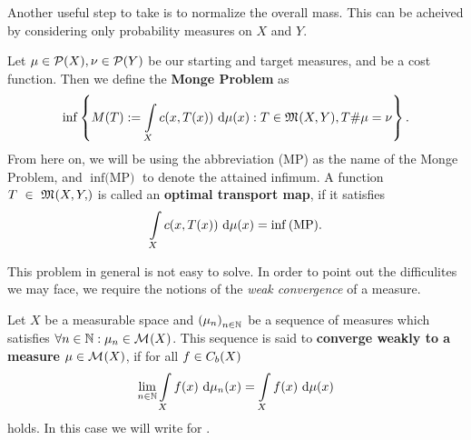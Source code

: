 Another useful step to take is to normalize the overall mass. This can be acheived by considering only probability measures on $X$ and $Y$.

\begin{definition}\label{MongeProb}
	Let $\mu \in \PM{X}, \nu \in \PM{Y}$ be our starting and target measures, and  be a cost function. Then we define the \textbf{Monge Problem} as
	\begin{equation}\label{MP}
		\inf \left\{ M(T) := \int\limits_X c(x, T(x))~\Dx{\mu} : T \in \MF{X}{Y}, \push{\mu} = \nu \right\}.
	\end{equation}
	From here on, we will be using the abbreviation (MP) as the name of the Monge Problem, and $\inf \text{(MP)}$ to denote the attained infimum. A function $T~\in~\MF{X, Y}$ is called an \textbf{optimal transport map}, if it satisfies
	\[ \int\limits_X c(x, T(x))~\Dx{\mu} = \inf \text{(MP)}. \]
\end{definition}

This problem in general is not easy to solve. In order to point out the difficulites we may face, we require the notions of the \textit{weak convergence} of a measure.



\begin{definition}\label{WeakConMeas}
	Let $X$ be a measurable space and ${(\mu_n)}_{\NinN}$ be a sequence of measures which satisfies $\forall \NinN: \mu_n \in \M{X}$. This sequence is said to \textbf{converge weakly to a measure} $\mu \in \M{X}$, if for all $f \in \CF[b]{X}$ 
	\[ \lim\limits_{\NinN} \int\limits_X f(x)~\Dx{\mu_n} = \int\limits_X f(x)~\Dx{\mu} \]
	holds. In this case we will write  for \Ninf{}.
\end{definition}


